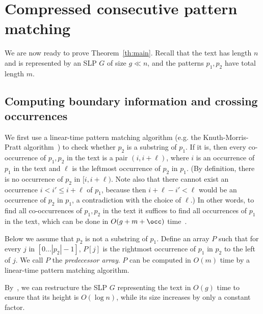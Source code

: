  
\section{Compressed consecutive pattern matching}
\label{pmgapped:sec:consec}
We are now ready to prove Theorem~\ref{th:main}. Recall that the text has length $n$ and is represented by an SLP $G$ of size $g \ll n$, and the patterns $p_1,p_2$ have total length $m$.

\subsection{Computing boundary information and crossing occurrences}
\label{pmgapped:sec:boundary}
We first use a linear-time pattern matching algorithm (e.g. the Knuth-Morris-Pratt algorithm~\cite{KMP}) to check whether $p_2$ is a substring of $p_1$. If it is, then every co-occurrence of $p_1, p_2$ in the text is a pair $(i,i+\ell)$, where $i$ is an occurrence of $p_1$ in the text and $\ell$ is the leftmost occurrence of $p_2$ in $p_1$. (By definition, there is no occurrence of $p_2$ in $[i,i+\ell)$. Note also that there cannot exist an occurrence $i < i' \le i+\ell$ of $p_1$, because then $i+\ell-i' < \ell$ would be an occurrence of $p_2$ in $p_1$, a contradiction with the choice of $\ell$.) In other words, to find all co-occurrences of $p_1,p_2$ in the text it suffices to find all occurrences of $p_1$ in the text, which can be done in $O(g+m+\occ)$ time~\cite{DBLP:conf/soda/GanardiG22}.

Below we assume that $p_2$ is not a substring of $p_1$. Define an array $P$ such that for every $j$ in $[0\dots |p_2|-1]$, $P[j]$ is the rightmost occurrence of $p_1$ in $p_2$ to the left of $j$. We call $P$ the \emph{predecessor array}. $P$ can be computed in $O(m)$ time by a linear-time pattern matching algorithm.

By~\cite{DBLP:conf/focs/GanardiJL19}, we can restructure the SLP $G$ representing the text in $O(g)$ time to ensure that its height is $O(\log n)$, while its size increases by only a constant factor. 

